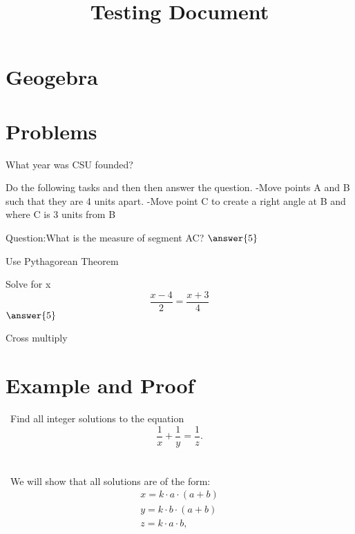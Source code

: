 \documentclass{ximera}
\title{Testing Document}
\begin{document}
\maketitle
\section{Geogebra}
\section{Problems}
\begin{problem}
\begin{multipleChoice}
What year was CSU founded?
\end{multipleChoice}
\end{problem}
\begin{problem}
Do the following tasks and then then answer the question.
    -Move points A and B such that they are 4 units apart.
    -Move point C to create a right angle at B and where C is 3 units from B
    
Question:What is the measure of segment AC?
$\answer{5}$
\begin{hint}
Use Pythagorean Theorem
\end{hint}
\begin{problem}
Solve for x
 \[\frac{x-4}{2}=\frac{x+3}{4}\]
$\answer{5}$
\begin{hint}
Cross multiply
\end{hint}
\end{problem}
\end{problem}

\section{Example and Proof}
\noindent \ Find all integer solutions to the equation
$$ \frac{1}{x} + \frac{1}{y} = \frac{1}{z}. $$ \\ \\

\noindent \ We will show that all solutions are of the form:
$$ \begin{array}{l}
x = k \cdot a \cdot \left(a + b\right) \\
y = k \cdot b \cdot \left(a + b\right) \\
z = k \cdot a \cdot b,
\end{array} $$
\end{document}
